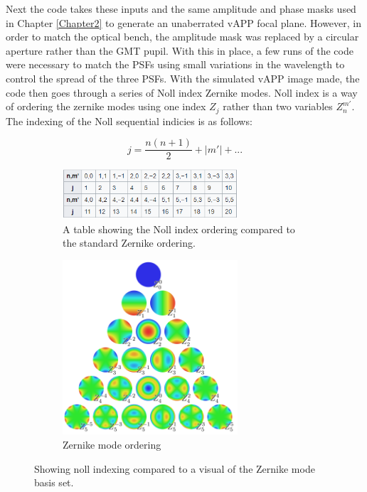 Next the code takes these inputs and the same amplitude and phase masks used in Chapter \ref{Chapter2} to generate an unaberrated vAPP focal plane.  However, in order to match the optical bench, the amplitude mask was replaced by a circular aperture rather than the GMT pupil.  With this in place, a few runs of the code were necessary to match the PSFs using small variations in the wavelength to control the spread of the three PSFs.  With the simulated vAPP image made, the code then goes through a series of Noll index Zernike modes.  Noll index is a way of ordering the zernike modes using one index $Z_j$ rather than two variables $Z_n^{m'}$\cite{Noll1976ZERNIKETURBULENCE.}.  The indexing of the Noll sequential indicies is as follows:

\begin{equation}
    j = \frac{n(n+1)}{2} + |m'| + ...
    \label{eq:noll}
\end{equation}

\begin{figure}[H]
\centering
\begin{subfigure}{.5\textwidth}
  \centering
  \includegraphics[width=6.5cm]{Figures/noll_indexing.png}
  \caption{A table showing the Noll index ordering compared to the standard Zernike ordering\cite{Noll1976ZERNIKETURBULENCE.}.}
  \label{fig:noll_table}
\end{subfigure}%
\begin{subfigure}{.5\textwidth}
  \centering
  \includegraphics[width=6.5cm]{Figures/1024px-Zernike_polynomials2.png}
  \caption{Zernike mode ordering \cite{Noll1976ZERNIKETURBULENCE.}}
  \label{fig:Zernike}
\end{subfigure}
\caption{Showing noll indexing compared to a visual of the Zernike mode basis set.}
\label{fig:zerns}
\end{figure}
